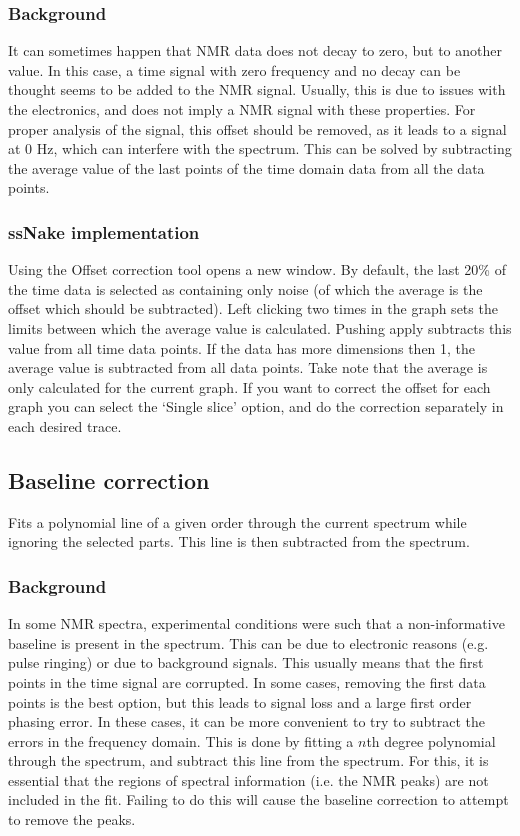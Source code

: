 \documentclass[11pt,a4paper]{article}
\begin{document}
\subsubsection*{Background}
It can sometimes happen that NMR data does not decay to zero, but to another value. In this case, a time signal with zero frequency and no decay can be thought seems to be added to the NMR signal. Usually, this is due to issues with the electronics, and does not imply a NMR signal with these properties. For proper analysis of the signal, this offset should be removed, as it leads to a signal at 0 Hz, which can interfere with the spectrum. This can be solved by subtracting the average value of the last points of the time domain data from all the data points.

\subsubsection*{ssNake implementation}
Using the Offset correction tool opens a new window. By default, the last 20\% of the time data is selected as containing only noise (of which the average is the offset which should be subtracted). Left clicking two times in the graph sets the limits between which the average value is calculated. Pushing apply subtracts this value from all time data points. If the data has more dimensions then 1, the average value is subtracted from all data points. Take note that the average is only calculated for the current graph. If you want to correct the offset for each graph you can select the `Single slice' option, and do the correction separately in each desired trace.

\subsection{Baseline correction}
Fits a polynomial line of a given order through the current spectrum while ignoring the selected parts. This line is then subtracted from the spectrum.

\subsubsection*{Background}
In some NMR spectra, experimental conditions were such that a non-informative baseline is present in the spectrum. This can be due to electronic reasons (e.g. pulse ringing) or due to background signals. This usually means that the first points in the time signal are corrupted. In some cases, removing the first data points is the best option, but this leads to signal loss and a large first order phasing error. In these cases, it can be more convenient to try to subtract the errors in the frequency domain. This is done by fitting a $n$th degree polynomial through  the spectrum, and subtract this line from the spectrum. For this, it is essential that the regions of spectral information (i.e. the NMR peaks) are not included in the fit. Failing to do this will cause the baseline correction to attempt to remove the peaks. 
\end{document}
